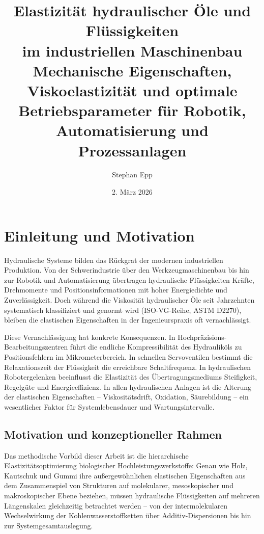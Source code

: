 ﻿\documentclass[a4paper,12pt]{scrreprt}
\title{%
  \textbf{Elastizität hydraulischer Öle und Flüssigkeiten\\
  im industriellen Maschinenbau}\\[0.5em]
  \large Mechanische Eigenschaften, Viskoelastizität und optimale\\
  Betriebsparameter für Robotik, Automatisierung und Prozessanlagen
}
\author{Stephan Epp}
\date{2. März 2026}
\theoremstyle{definition}
\begin{document}
\maketitle
\tableofcontents
\newpage

\section{Einleitung und Motivation}

Hydraulische Systeme bilden das Rückgrat der modernen industriellen Produktion.
Von der Schwerindustrie über den Werkzeugmaschinenbau bis hin zur Robotik und
Automatisierung übertragen hydraulische Flüssigkeiten Kräfte, Drehmomente und
Positionsinformationen mit hoher Energiedichte und Zuverlässigkeit. Doch
während die Viskosität hydraulischer Öle seit Jahrzehnten systematisch
klassifiziert und genormt wird (ISO-VG-Reihe, ASTM D2270), bleiben die
elastischen Eigenschaften in der Ingenieurspraxis oft vernachlässigt.

Diese Vernachlässigung hat konkrete Konsequenzen. In Hochpräzisions-Bearbeitungs\-zentren
führt die endliche Kompressibilität des Hydrauliköls zu Positionsfehlern im
Mikrometerbereich. In schnellen Servoventilen bestimmt die Relaxationszeit der
Flüssigkeit die erreichbare Schaltfrequenz. In hydraulischen Robotergelenken
beeinflusst die Elastizität des Übertragungsmediums Steifigkeit, Regelgüte und
Energieeffizienz. In allen hydraulischen Anlagen ist die Alterung der
elastischen Eigenschaften -- Viskositätsdrift, Oxidation, Säurebildung -- ein
wesentlicher Faktor für Systemlebensdauer und Wartungsintervalle.

\subsection{Motivation und konzeptioneller Rahmen}

Das methodische Vorbild dieser Arbeit ist die hierarchische Elastizitätsoptimierung
biologischer Hochleistungswerkstoffe: Genau wie Holz, Kautschuk und Gummi
ihre außergewöhnlichen elastischen Eigenschaften aus dem Zusammenspiel von
Strukturen auf molekularer, mesoskopischer und makroskopischer Ebene beziehen,
müssen hydraulische Flüssigkeiten auf mehreren Längenskalen gleichzeitig
betrachtet werden -- von der intermolekularen Wechselwirkung der
Kohlenwasserstoffketten über Additiv-Dispersionen bis hin zur
System\-gesamtauslegung.
\end{document}
